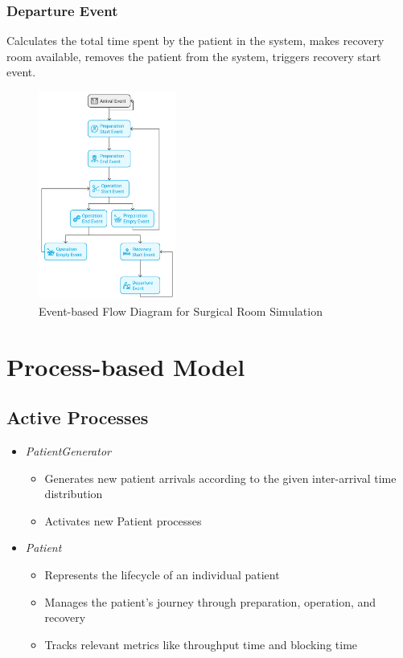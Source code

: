 \documentclass{article}
\begin{document}
\subsubsection{Departure Event}
Calculates the total time spent by the patient in the system, makes recovery room available, removes the patient from the system, triggers recovery start event.

\begin{figure}[ht]
    \centering
    \includegraphics[width=0.4\textwidth]{static/event-based.png}
    \caption{Event-based Flow Diagram for Surgical Room Simulation}
    \label{fig:eventflow}
\end{figure}

\section{Process-based Model}

\subsection{Active Processes}
\begin{itemize}
    \item \textit{PatientGenerator}
    \begin{itemize}
        \item Generates new patient arrivals according to the given inter-arrival time distribution
        \item Activates new Patient processes
    \end{itemize}
    \item \textit{Patient}
    \begin{itemize}
        \item Represents the lifecycle of an individual patient
        \item Manages the patient's journey through preparation, operation, and recovery
        \item Tracks relevant metrics like throughput time and blocking time
    \end{itemize}
\end{itemize}
\end{document}

